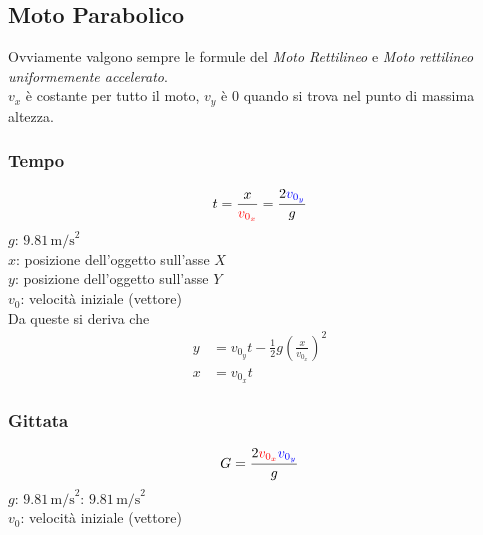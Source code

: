 \subsection{Moto Parabolico}\label{subsec:cinematica:mp}
\begin{center}
\end{center}
Ovviamente valgono sempre le formule del \textit{Moto Rettilineo} e \textit{Moto rettilineo 
uniformemente accelerato}.\\
$v_{x}$ è costante per tutto il moto, $v_{y}$ è $0$ quando si trova nel punto di massima altezza.

\subsubsection{Tempo}
\begin{equation*}
t = \frac{x}{\mathcolor{red}{v_{0_x}}} =
\frac{2\mathcolor{blue}{v_{0_y}}}{g}
\end{equation*}
\hyperref[tab:g]{$g$}: $9.81\,\text{m/s}^2$\\
$x$: posizione dell'oggetto sull'asse $X$\\
$y$: posizione dell'oggetto sull'asse $Y$\\
$v_0$: velocità iniziale (vettore)\\[\baselineskip]
Da queste si deriva che
\begin{align*}
  y&=v_{0_y}t-\frac{1}{2}g\left(\frac{x}{v_{0_x}}\right)^2\\
  x&=v_{0_x}t
\end{align*}
\subsubsection{Gittata}
\begin{equation*}
G = \frac{2\mathcolor{red}{v_{0_x}}\mathcolor{blue}{v_{0_y}}}{g}
\end{equation*}
\hyperref[tab:g]{$g$}: $9.81\,\text{m/s}^2$: $9.81\,\text{m/s}^2$\\
$v_0$: velocità iniziale (vettore)

